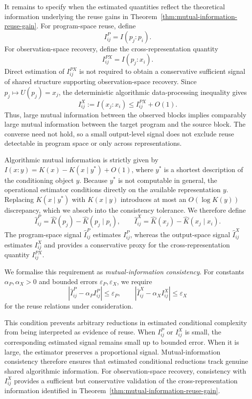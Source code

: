 \documentclass{article}
\begin{document}
It remains to specify when the estimated quantities reflect the theoretical information underlying the reuse gains in Theorem~\ref{thm:mutual-information-reuse-gain}. For program-space reuse, define
\[
I_{ij}^{P}
=
I(p_j:p_i).
\]
For observation-space recovery, define the cross-representation quantity
\[
I_{ij}^{PX}
=
I(p_j:x_i).
\]
Direct estimation of \(I_{ij}^{PX}\) is not required to obtain a conservative sufficient signal of shared structure supporting observation-space recovery. Since \(p_j\mapsto U(p_j)=x_j\), the deterministic algorithmic data-processing inequality gives \cite{grunwald_shannon_2004}
\[
I_{ij}^{X}
:=
I(x_j:x_i)
\leq
I_{ij}^{PX}
+
O(1).
\]
Thus, large mutual information between the observed blocks implies comparably large mutual information between the target program and the source block. The converse need not hold, so a small output-level signal does not exclude reuse detectable in program space or only across representations.

Algorithmic mutual information is strictly given by \(I(x:y)=K(x)-K(x\mid y^*)+O(1)\), where \(y^*\) is a shortest description of the conditioning object \(y\). Because \(y^*\) is not computable in general, the operational estimator conditions directly on the available representation \(y\). Replacing \(K(x\mid y^*)\) with \(K(x\mid y)\) introduces at most an \(O(\log K(y))\) discrepancy, which we absorb into the consistency tolerance. We therefore define
\[
\hat I_{ij}^{P}
=
\hat K(p_j)-\hat K(p_j\mid p_i),
\qquad
\hat I_{ij}^{X}
=
\hat K(x_j)-\hat K(x_j\mid x_i).
\]
The program-space signal \(\hat I_{ij}^{P}\) estimates \(I_{ij}^{P}\), whereas the output-space signal \(\hat I_{ij}^{X}\) estimates \(I_{ij}^{X}\) and provides a conservative proxy for the cross-representation quantity \(I_{ij}^{PX}\). 

We formalise this requirement as \emph{mutual-information consistency}. For constants \(\alpha_P,\alpha_X>0\) and bounded errors \(\varepsilon_P,\varepsilon_X\), we require
\[
\left|
\hat I_{ij}^{P}
-
\alpha_P I_{ij}^{P}
\right|
\leq
\varepsilon_P,
\qquad
\left|
\hat I_{ij}^{X}
-
\alpha_X I_{ij}^{X}
\right|
\leq
\varepsilon_X
\]
for the reuse relations under consideration.

This condition prevents arbitrary reductions in estimated conditional complexity from being interpreted as evidence of reuse. When \(I_{ij}^{P}\) or \(I_{ij}^{X}\) is small, the corresponding estimated signal remains small up to bounded error. When it is large, the estimator preserves a proportional signal. Mutual-information consistency therefore ensures that estimated conditional reductions track genuine shared algorithmic information. For observation-space recovery, consistency with \(I_{ij}^{X}\) provides a sufficient but conservative validation of the cross-representation information identified in Theorem~\ref{thm:mutual-information-reuse-gain}.
\end{document}
